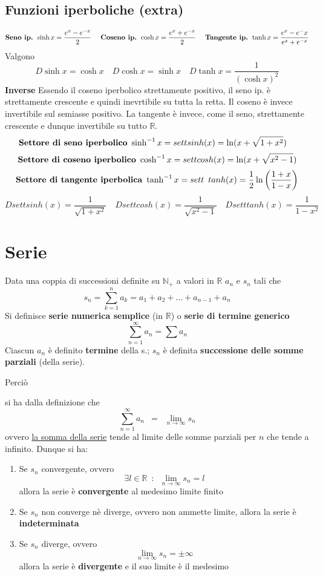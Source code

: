 \documentclass[10pt, oneside]{book}
\theoremstyle{plain}
\begin{document}
\section{Funzioni iperboliche (extra)}
\[\textrm{\textbf{Seno ip.} } \sinh{x} = \frac{e^x - e^{-x}}{2} \quad \textrm{  \textbf{Coseno ip.} } \cosh{x} = \frac{e^x + e^{-x}}{2} \quad \textrm{  \textbf{Tangente ip.} } \tanh{x} = \frac{e^x - e^-x}{e^x + e^{-x}}\]
Valgono
\[D\sinh{x} = \cosh{x} \quad D\cosh{x} = \sinh{x} \quad D\tanh{x} = \frac{1}{(\cosh{x})^2}\]
\textbf{Inverse} Essendo il coseno iperbolico strettamente positivo, il seno ip. è strettamente crescente e quindi inevrtibile su tutta la retta. Il coseno è invece invertibile sul semiasse positivo. La tangente è invece, come il seno, strettamente crescente e dunque invertibile su tutto $\mathbb{R}$.
\[\textrm{\textbf{Settore di seno iperbolico} } \sinh^{-1}{x} = settsinh (x) = \ln(x + \sqrt{1 + x^2}) \quad \] \[\textrm{\textbf{Settore di coseno iperbolico} } \cosh^{-1}{x} = settcosh (x) = \ln(x + \sqrt{x^2-1})\]
\[\textrm{\textbf{Settore di tangente iperbolica} } \tanh^{-1}{x} =  sett \enspace tanh (x) = \frac{1}{2}\ln\bigg(\frac{1+x}{1-x}\bigg)\]
\[Dsettsinh(x) = \frac{1}{\sqrt{1 + x^2}} \quad Dsettcosh(x) = \frac{1}{\sqrt{x^2-1}} \quad Dsett tanh (x) = \frac{1}{1 - x^2}\]

\chapter{Serie}
\begin{defin}
Data una coppia di successioni definite su $\mathbb{N}_+$ a valori in $\mathbb{R}$ $a_n$ e $s_n$ tali che
\[s_n = \sum \limits_{k=1}^{n} a_k = a_1 + a_2 + ... + a_{n-1} + a_n\]
Si definisce \textbf{serie numerica semplice} (in $\mathbb{R}$) o \textbf{serie di termine generico}
\[\sum \limits_{n=1}^{\infty} a_n = \sum a_n\]
Ciascun $a_n$ è definito \textbf{termine} della s.; $s_n$ è definita \textbf{successione delle somme parziali} (della serie).
\end{defin}
\hypertarget{sommeparziali}{Perciò} si ha dalla definizione che
\[\sum \limits_{n=1}^{\infty} a_n \enspace = \enspace \lim \limits_{n \rightarrow \infty} s_n\]
ovvero \underline{la somma della serie} tende al limite delle somme parziali per $n$ che tende a infinito. Dunque si ha:
\begin{enumerate}
    \item Se $s_n$ convergente, ovvero \[\exists l \in \mathbb{R} \enspace : \enspace \lim \limits_{n \rightarrow \infty} s_n = l\]
    allora la serie è \textbf{convergente} al medesimo limite finito
    \item Se $s_n$ non converge nè diverge, ovvero non ammette limite, allora la serie è \textbf{indeterminata}
    \item Se $s_n$ diverge, ovvero \[\lim \limits_{n \rightarrow \infty} s_n = \pm \infty\] allora la serie è \textbf{divergente} e il suo limite è il medesimo
\end{enumerate}
\end{document}
